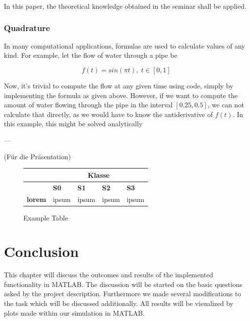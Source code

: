 \documentclass[12pt, a4paper, oneside]{article}
\begin{document}
	In this paper, the theoretical knowledge obtained in the seminar shall be applied. 
	
	\subsubsection{Quadrature}
	In many computational applications, formulas 	are used to calculate values of any kind. For example, let the flow of water through a pipe be 

	\begin{equation}
	f(t) = sin(\pi t), \; t \in [0,1]
	\end{equation}

Now, it's trivial to compute the flow at any given time using code, simply by implementing the formula as given above. However, if we want to compute the amount of water flowing through the pipe in the interval $[0.25, 0.5]$, we can not calculate that directly, as we would have to know the antiderivative of $f(t)$. In this example, this might be solved analytically 



---	
	
	
	(Für die Präsentation)
	
	
%		

	\blindtext
	\begin{figure}[ht]
		\begin{longtable}{|p{2,5cm}|p{}|p{}|p{3cm}|p{3cm}|}
			\hline
			&\multicolumn{4}{c|}{\textbf{Klasse}} \\
			\hline
			& \textbf{S0} & \textbf{S1} & \textbf{S2} & \textbf{S3} \\
			\hline
			\textbf{lorem} & ipsum & ipsum & ipsum & ipsum \\
			\hline
		\end{longtable}
		\label{fig:example-figure}
		\caption{Example Table}
	\end{figure}
	\blindtext
	\blindtext
	\blindtext
	
	
	\section{Conclusion}
	This chapter will discuss the outcomes and results of the implemented functionality in MATLAB.
	The discussion will be started on the basic questions asked by the project description.
	Furthermore we made several modifications to the task which will be discussed additionally.
	All results will be visualized by plots made within our simulation in MATLAB.
\end{document}
